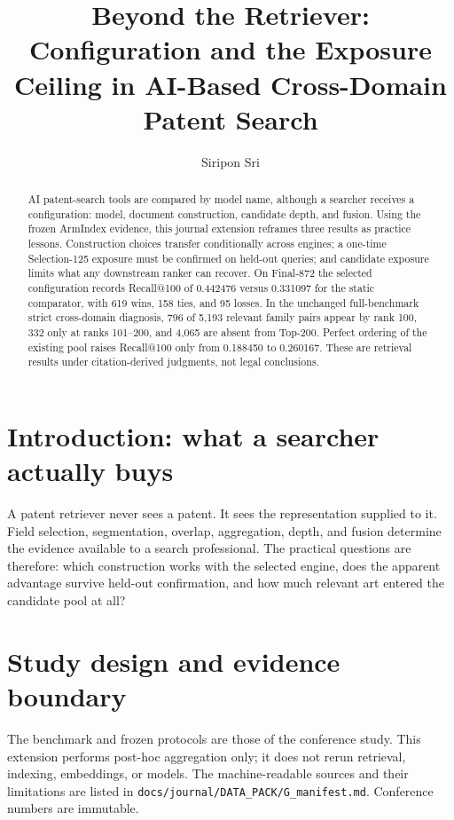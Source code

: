 \documentclass[preprint,12pt]{elsarticle}
\begin{document}
\begin{frontmatter}
\title{Beyond the Retriever: Configuration and the Exposure Ceiling in AI-Based Cross-Domain Patent Search}
\author{Siripon Sri}
\address{myIS Research}
\begin{abstract}
AI patent-search tools are compared by model name, although a searcher receives a configuration: model, document construction, candidate depth, and fusion. Using the frozen ArmIndex evidence, this journal extension reframes three results as practice lessons. Construction choices transfer conditionally across engines; a one-time Selection-125 exposure must be confirmed on held-out queries; and candidate exposure limits what any downstream ranker can recover. On Final-872 the selected configuration records Recall@100 of 0.442476 versus 0.331097 for the static comparator, with 619 wins, 158 ties, and 95 losses. In the unchanged full-benchmark strict cross-domain diagnosis, 796 of 5,193 relevant family pairs appear by rank 100, 332 only at ranks 101--200, and 4,065 are absent from Top-200. Perfect ordering of the existing pool raises Recall@100 only from 0.188450 to 0.260167. These are retrieval results under citation-derived judgments, not legal conclusions.
\end{abstract}
\end{frontmatter}

\section{Introduction: what a searcher actually buys}
A patent retriever never sees a patent. It sees the representation supplied to it. Field selection, segmentation, overlap, aggregation, depth, and fusion determine the evidence available to a search professional. The practical questions are therefore: which construction works with the selected engine, does the apparent advantage survive held-out confirmation, and how much relevant art entered the candidate pool at all?

\section{Study design and evidence boundary}
The benchmark and frozen protocols are those of the conference study. This extension performs post-hoc aggregation only; it does not rerun retrieval, indexing, embeddings, or models. The machine-readable sources and their limitations are listed in \texttt{docs/journal/DATA\_PACK/G\_manifest.md}. Conference numbers are immutable.
\end{document}
